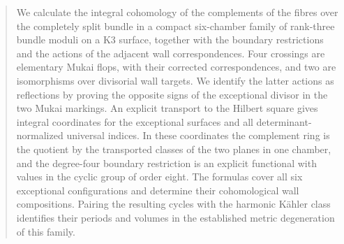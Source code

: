 

\begin{abstract}
We calculate the integral cohomology of the complements of the fibres over
the completely split bundle in a compact six-chamber family of rank-three bundle
moduli on a K3 surface, together with the boundary restrictions and the
actions of the adjacent wall correspondences. Four crossings are elementary
Mukai flops, with their corrected correspondences, and two are isomorphisms
over divisorial wall targets. We identify the latter actions as reflections
by proving the opposite signs of the exceptional divisor in the two Mukai
markings. An explicit transport to the Hilbert square gives integral
coordinates for the exceptional surfaces and all determinant-normalized
universal indices. In these coordinates the complement ring is the quotient
by the transported classes of the two planes in one chamber, and the
degree-four boundary restriction is an explicit functional with values
in the cyclic group of order eight. The formulas
cover all six exceptional configurations and determine their cohomological
wall compositions. Pairing the resulting cycles with the harmonic Kähler
class identifies their periods and volumes in the established metric
degeneration of this family.
\end{abstract}
\maketitle
\enlargethispage{4pt}







\clearpage


